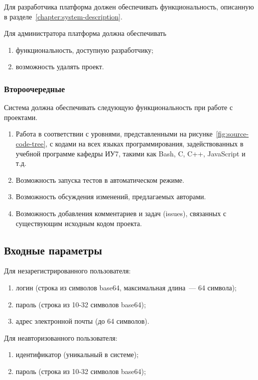 \documentclass{bmstu}
\begin{document}
  Для разработчика платформа должен обеспечивать функциональность,
  описанную в разделе~\ref{chapter:system-description}.

  Для администратора платформа должна обеспечивать
  \begin{enumerate}[label*=\arabic*)]
    \item функциональность, доступную разработчику;
    \item возможность удалять проект.
  \end{enumerate}

  \subsubsection{Второочередные}

  Система должна обеспечивать следующую функциональность при работе с проектами.
  \begin{enumerate}[label*=\arabic*.]
    \item Работа в соответствии с уровнями, представленными на
      рисунке~\ref{fig:source-code-tree}, с кодами на всех языках
      программирования, задействованных в учебной программе кафедры
      ИУ7, такими как Bash, C, C++, JavaScript и т.д.
    \item Возможность запуска тестов в автоматическом режиме.
    \item Возможность обсуждения изменений, предлагаемых авторами.
    \item Возможность добавления комментариев и задач (issues),
      связанных с существующим исходным кодом проекта.
  \end{enumerate}

  \subsection{Входные параметры}

  Для незарегистрированного пользователя:
  \begin{enumerate}[label*=\arabic*)]
    \item логин (строка из символов base64, максимальная длина~--- 64
      символа);
    \item пароль (строка из 10-32 символов base64);
    \item адрес электронной почты (до 64 символов).
  \end{enumerate}

  Для неавторизованного пользователя:
  \begin{enumerate}[label*=\arabic*)]
    \item идентификатор (уникальный в системе);
    \item пароль (строка из 10-32 символов base64);
  \end{enumerate}
\end{document}
